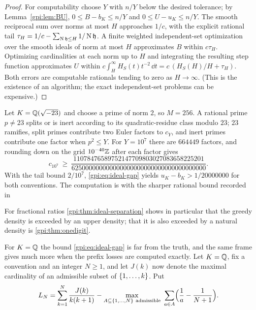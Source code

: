 \begin{proof}
For computability choose $Y$ with $n/Y$ below the desired tolerance; by
Lemma~\ref{gpi:lem:BU}, $0\le B-b_K\le n/Y$ and $0\le U-u_K\le n/Y$. The smooth reciprocal sum over
norms at most $H$ approaches $1/c$, with the explicit rational tail
$\tau_H=1/c-\sum_{\operatorname{N}\mathfrak h\le H}1/\operatorname{N}\mathfrak h$. A finite weighted independent-set
optimization over the smooth ideals of norm at most $H$ approximates $B$ within $c\tau_H$.
Optimizing cardinalities at each norm up to $H$ and integrating the resulting step function
approximates $U$ within $c\int_H^\infty H_S(t)t^{-2}\,\dd t=c\,(H_S(H)/H+\tau_H)$. Both errors
are computable rationals tending to zero as $H\to\infty$. (This is the existence of an
algorithm; the exact independent-set problems can be expensive.)
\end{proof}

\begin{example}\label{gpi:ex:Q23gap}
Let $K=\mathbb{Q}(\sqrt{-23})$ and choose a prime of norm $2$, so $M=256$. A rational prime $p\ne23$
splits or is inert according to its quadratic-residue class modulo $23$; $23$ ramifies, split
primes contribute two Euler factors to $c_Y$, and inert primes contribute one factor when
$p^2\le Y$. For $Y=10^7$ there are $664449$ factors, and rounding down on the grid
$10^{-40}\mathbb{Z}$ after each factor gives
\[
 c_{10^7}\ \ge\ \frac{11078476589752147709803027083658225201}
 {625000000000000000000000000000000000000}.
\]
With the tail bound $2/10^7$, \eqref{gpi:eq:ideal-gap} yields
$u_K-b_K>1/20000000$ for both conventions. The computation is
with the sharper rational bound recorded in
\end{example}

For fractional ratios \cref{gpi:thm:ideal-separation} shows in particular that the greedy
density is exceeded by an upper density; that it is also exceeded by a natural density is
\cref{gpi:thm:onedigit}.

For $K=\mathbb{Q}$ the bound \eqref{gpi:eq:ideal-gap} is far from the truth, and the same frame gives
much more when the prefix losses are computed exactly. Let $K=\mathbb{Q}$, fix a convention and an
integer $N\ge1$, and let $J(k)$ now denote the maximal cardinality of an admissible subset of
$\{1,\dots,k\}$. Put
\begin{equation}\label{gpi:eq:LN}
 L_N=\sum_{k=1}^N\frac{J(k)}{k(k+1)}
 -\max_{A\subseteq\{1,\dots,N\}\ \mathrm{admissible}}\
 \sum_{a\in A}\Bigl(\frac1a-\frac1{N+1}\Bigr).
\end{equation}

